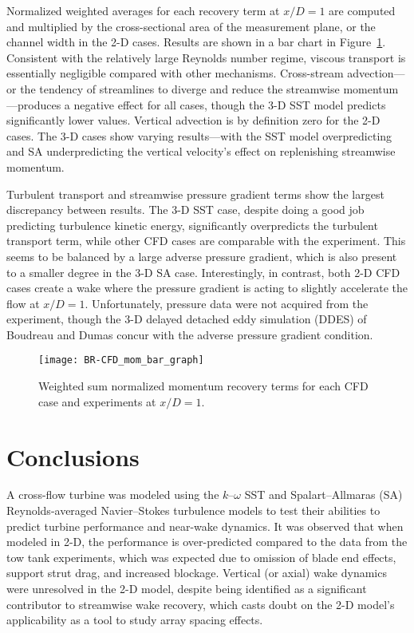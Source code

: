 Normalized weighted averages for each recovery term at $x/D=1$ are computed and
multiplied by the cross-sectional area of the measurement plane, or the channel
width in the 2-D cases. Results are shown in a bar chart in
Figure~\ref{fig:br-cfd-recovery}. Consistent with the relatively large Reynolds
number regime, viscous transport is essentially negligible compared with other
mechanisms. Cross-stream advection---or the tendency of streamlines to diverge
and reduce the streamwise momentum---produces a negative effect for all cases,
though the 3-D SST model predicts significantly lower values. Vertical advection
is by definition zero for the 2-D cases. The 3-D cases show varying
results---with the SST model overpredicting and SA underpredicting the vertical
velocity's effect on replenishing streamwise momentum.

Turbulent transport and streamwise pressure gradient terms show the largest
discrepancy between results. The 3-D SST case, despite doing a good job
predicting turbulence kinetic energy, significantly overpredicts the turbulent
transport term, while other CFD cases are comparable with the experiment. This
seems to be balanced by a large adverse pressure gradient, which is also present
to a smaller degree in the 3-D SA case. Interestingly, in contrast, both 2-D CFD
cases create a wake where the pressure gradient is acting to slightly accelerate
the flow at $x/D=1$. Unfortunately, pressure data were not acquired from the
experiment, though the 3-D delayed detached eddy simulation (DDES) of Boudreau
and Dumas \cite{Boudreau2015} concur with the adverse pressure gradient
condition.

\begin{figure}
    \centering

    \texttt{[image: BR-CFD\_mom\_bar\_graph]}

    \caption{Weighted sum normalized momentum recovery terms for each CFD case
        and experiments\cite{Bachant2016-RVAT-Re-dep} at $x/D=1$.}

    \label{fig:br-cfd-recovery}
\end{figure}


\section{Conclusions}

A cross-flow turbine was modeled using the $k$--$\omega$ SST and
Spalart--Allmaras (SA) Reynolds-averaged Navier--Stokes turbulence models to test
their abilities to predict turbine performance and near-wake dynamics. It was
observed that when modeled in 2-D, the performance is over-predicted compared to
the data from the tow tank experiments, which was expected due to omission of
blade end effects, support strut drag, and increased blockage. Vertical (or
axial) wake dynamics were unresolved in the 2-D model, despite being identified
as a significant contributor to streamwise wake recovery, which casts doubt on
the 2-D model's applicability as a tool to study array spacing effects.

